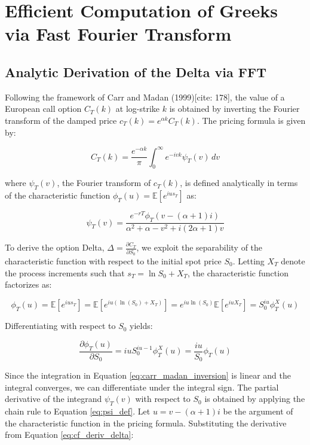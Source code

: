 \documentclass{article}
\begin{document}
\section{Efficient Computation of Greeks via Fast Fourier Transform}
\subsection{Analytic Derivation of the Delta via FFT}

Following the framework of Carr and Madan (1999)[cite: 178], the value of a European call option $C_T(k)$ at log-strike $k$ is obtained by inverting the Fourier transform of the damped price $c_T(k) = e^{\alpha k}C_T(k)$. The pricing formula is given by:

\begin{equation}
    C_T(k) = \frac{e^{-\alpha k}}{\pi} \int_{0}^{\infty} e^{-ivk} \psi_T(v) \, dv
    \label{eq:carr_madan_inversion}
\end{equation}

where $\psi_T(v)$, the Fourier transform of $c_T(k)$, is defined analytically in terms of the characteristic function $\phi_T(u) = \mathbb{E}[e^{iu s_T}]$ as:

\begin{equation}
    \psi_T(v) = \frac{e^{-rT} \phi_T(v - (\alpha+1)i)}{\alpha^2 + \alpha - v^2 + i(2\alpha+1)v}
    \label{eq:psi_def}
\end{equation}

To derive the option Delta, $\Delta = \frac{\partial C_T}{\partial S_0}$, we exploit the separability of the characteristic function with respect to the initial spot price $S_0$. Letting $X_T$ denote the process increments such that $s_T = \ln S_0 + X_T$, the characteristic function factorizes as:

\begin{equation}
    \phi_T(u) = \mathbb{E}[e^{i u s_T}] = \mathbb{E}[e^{i u (\ln(S_0) + X_T)}] = e^{i u \ln(S_0)} \mathbb{E}[e^{i u X_T}] = S_0^{i u} \phi_T^{X}(u)
\end{equation}

Differentiating with respect to $S_0$ yields:

\begin{equation}
    \frac{\partial \phi_T(u)}{\partial S_0} = i u S_0^{i u - 1} \phi_T^{X}(u) = \frac{i u}{S_0} \phi_T(u)
    \label{eq:cf_deriv_delta}
\end{equation}

Since the integration in Equation 
\eqref{eq:carr_madan_inversion} 
is linear and the integral converges, we can differentiate under the integral sign. The partial derivative of the integrand $\psi_T(v)$ with respect to $S_0$ is obtained by applying the chain rule to Equation \eqref{eq:psi_def}.
Let $u = v - (\alpha+1)i$ be the argument of the characteristic function in the pricing formula. Substituting the derivative from Equation \eqref{eq:cf_deriv_delta}:
\end{document}
